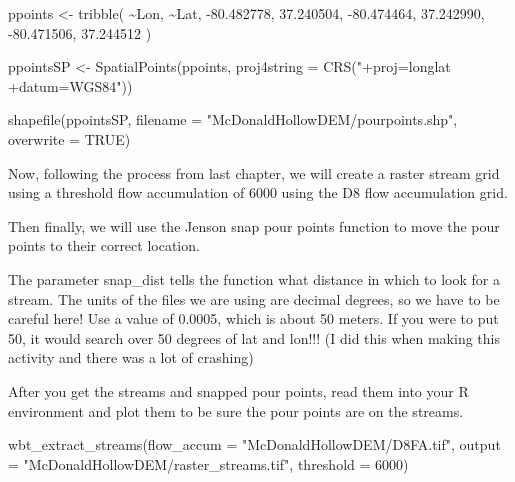 \documentclass[
]{book}
\newenvironment{Shaded}{\begin{snugshade}}{\end{snugshade}}
\newcommand{\AttributeTok}[1]{\textcolor[rgb]{0.77,0.63,0.00}{#1}}
\newcommand{\ConstantTok}[1]{\textcolor[rgb]{0.00,0.00,0.00}{#1}}
\newcommand{\DecValTok}[1]{\textcolor[rgb]{0.00,0.00,0.81}{#1}}
\newcommand{\FloatTok}[1]{\textcolor[rgb]{0.00,0.00,0.81}{#1}}
\newcommand{\FunctionTok}[1]{\textcolor[rgb]{0.00,0.00,0.00}{#1}}
\newcommand{\NormalTok}[1]{#1}
\newcommand{\OtherTok}[1]{\textcolor[rgb]{0.56,0.35,0.01}{#1}}
\newcommand{\SpecialCharTok}[1]{\textcolor[rgb]{0.00,0.00,0.00}{#1}}
\newcommand{\StringTok}[1]{\textcolor[rgb]{0.31,0.60,0.02}{#1}}
\begin{document}
\begin{Shaded}
\begin{Highlighting}[]
\NormalTok{ppoints }\OtherTok{\textless{}{-}} \FunctionTok{tribble}\NormalTok{(}
          \SpecialCharTok{\textasciitilde{}}\NormalTok{Lon, }\SpecialCharTok{\textasciitilde{}}\NormalTok{Lat,}
          \SpecialCharTok{{-}}\FloatTok{80.482778}\NormalTok{, }\FloatTok{37.240504}\NormalTok{,}
          \SpecialCharTok{{-}}\FloatTok{80.474464}\NormalTok{, }\FloatTok{37.242990}\NormalTok{,}
          \SpecialCharTok{{-}}\FloatTok{80.471506}\NormalTok{, }\FloatTok{37.244512}
\NormalTok{          )}

\NormalTok{ppointsSP }\OtherTok{\textless{}{-}} \FunctionTok{SpatialPoints}\NormalTok{(ppoints, }\AttributeTok{proj4string =} \FunctionTok{CRS}\NormalTok{(}\StringTok{"+proj=longlat +datum=WGS84"}\NormalTok{))}

\FunctionTok{shapefile}\NormalTok{(ppointsSP, }\AttributeTok{filename =} \StringTok{"McDonaldHollowDEM/pourpoints.shp"}\NormalTok{, }\AttributeTok{overwrite =} \ConstantTok{TRUE}\NormalTok{)}
\end{Highlighting}
\end{Shaded}

Now, following the process from last chapter, we will create a raster stream grid using a threshold flow accumulation of 6000 using the D8 flow accumulation grid.

Then finally, we will use the Jenson snap pour points function to move the pour points to their correct location.

The parameter snap\_dist tells the function what distance in which to look for a stream. The units of the files we are using are decimal degrees, so we have to be careful here! Use a value of 0.0005, which is about 50 meters. If you were to put 50, it would search over 50 degrees of lat and lon!!! (I did this when making this activity and there was a lot of crashing)

After you get the streams and snapped pour points, read them into your R environment and plot them to be sure the pour points are on the streams.

\begin{Shaded}
\begin{Highlighting}[]
\FunctionTok{wbt\_extract\_streams}\NormalTok{(}\AttributeTok{flow\_accum =} \StringTok{"McDonaldHollowDEM/D8FA.tif"}\NormalTok{,}
                    \AttributeTok{output =} \StringTok{"McDonaldHollowDEM/raster\_streams.tif"}\NormalTok{,}
                    \AttributeTok{threshold =} \DecValTok{6000}\NormalTok{)}
\end{Highlighting}
\end{Shaded}
\end{document}
